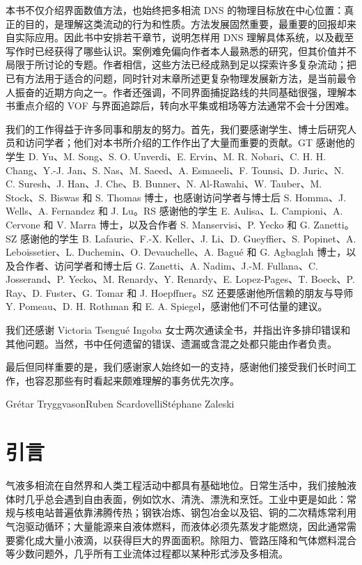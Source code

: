 \documentclass[11pt,a4paper,openany,fontset=none]{ctexbook}
\begin{document}
本书不仅介绍界面数值方法，也始终把多相流 DNS 的物理目标放在中心位置：真正的目的，是理解这类流动的行为和性质。方法发展固然重要，最重要的回报却来自实际应用。因此书中安排若干章节，说明怎样用 DNS 理解具体系统，以及截至写作时已经获得了哪些认识。案例难免偏向作者本人最熟悉的研究，但其价值并不局限于所讨论的专题。作者相信，这些方法已经成熟到足以探索许多复杂流动；把已有方法用于适合的问题，同时针对末章所述更复杂物理发展新方法，是当前最令人振奋的近期方向之一。作者还强调，不同界面捕捉路线的共同基础很强，理解本书重点介绍的 VOF 与界面追踪后，转向水平集或相场等方法通常不会十分困难。

我们的工作得益于许多同事和朋友的努力。首先，我们要感谢学生、博士后研究人员和访问学者；他们对本书所介绍的工作作出了大量而重要的贡献。GT 感谢他的学生 D. Yu、M. Song、S. O. Unverdi、E. Ervin、M. R. Nobari、C. H. H. Chang、Y.-J. Jan、S. Nas、M. Saeed、A. Esmaeeli、F. Tounsi、D. Juric、N. C. Suresh、J. Han、J. Che、B. Bunner、N. Al-Rawahi、W. Tauber、M. Stock、S. Biswas 和 S. Thomas 博士，也感谢访问学者与博士后 S. Homma、J. Wells、A. Fernandez 和 J. Lu。RS 感谢他的学生 E. Aulisa、L. Campioni、A. Cervone 和 V. Marra 博士，以及合作者 S. Manservisi、P. Yecko 和 G. Zanetti。SZ 感谢他的学生 B. Lafaurie、F.-X. Keller、J. Li、D. Gueyffier、S. Popinet、A. Leboissetier、L. Duchemin、O. Devauchelle、A. Bagu\'e 和 G. Agbaglah 博士，以及合作者、访问学者和博士后 G. Zanetti、A. Nadim、J.-M. Fullana、C. Josserand、P. Yecko、M. Renardy、Y. Renardy、E. Lopez-Pages、T. Boeck、P. Ray、D. Fuster、G. Tomar 和 J. Hoepffner。SZ 还要感谢他所信赖的朋友与导师 Y. Pomeau、D. H. Rothman 和 E. A. Spiegel，感谢他们不可估量的建议。

我们还感谢 Victoria Tsengu\'e Ingoba 女士两次通读全书，并指出许多排印错误和其他问题。当然，书中任何遗留的错误、遗漏或含混之处都只能由作者负责。

最后但同样重要的是，我们感谢家人始终如一的支持，感谢他们接受我们长时间工作，也容忍那些有时看起来颇难理解的事务优先次序。

\begin{flushright}
Gr\'etar Tryggvason\quad Ruben Scardovelli\quad St\'ephane Zaleski
\end{flushright}

\chapter{引言}

气液多相流在自然界和人类工程活动中都具有基础地位。日常生活中，我们接触液体时几乎总会遇到自由表面，例如饮水、清洗、漂洗和烹饪。工业中更是如此：常规与核电站普遍依靠沸腾传热；钢铁冶炼、钢包冶金以及铝、铜的二次精炼常利用气泡驱动循环；大量能源来自液体燃料，而液体必须先蒸发才能燃烧，因此通常需要雾化成大量小液滴，以获得巨大的界面面积。除阻力、管路压降和气体燃料混合等少数问题外，几乎所有工业流体过程都以某种形式涉及多相流。
\end{document}
